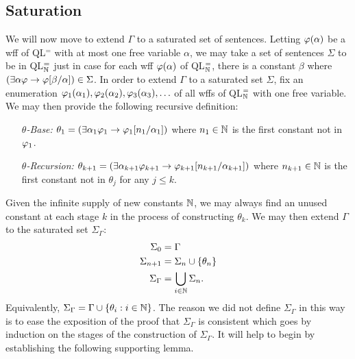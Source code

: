 \subsection{Saturation}%
  \label{sub:Saturation}

We will now move to extend $\Gamma$ to a saturated set of sentences.
Letting $\varphi(\alpha)$ be a wff of QL$^=$ with at most one free variable $\alpha$, we may take a set of sentences $\Sigma$ to be  in QL$^=_{\mathbb{N}}$ just in case for each wff $\varphi(\alpha)$ of QL$^=_{\mathbb{N}}$, there is a constant $\beta$ where $(\exists \alpha\varphi \rightarrow \varphi[\beta/\alpha])\in\Sigma$.
In order to extend $\Gamma$ to a saturated set $\Sigma$, fix an enumeration $\varphi_1(\alpha_1),\varphi_2(\alpha_2),\varphi_3(\alpha_3),\ldots$ of all wffs of QL$^=_{\mathbb{N}}$ with one free variable. %
We may then provide the following recursive definition:
\begin{enumerate}[leftmargin=1in]
  \item[\it $\theta$-Base:] $\theta_1=(\exists \alpha_1\varphi_1\rightarrow \varphi_1[n_1/\alpha_1])$ where $n_1\in\mathbb{N}$ is the first constant not in $\varphi_1$.
  \item[\it $\theta$-Recursion:] $\theta_{k+1}=(\exists \alpha_{k+1}\varphi_{k+1}\rightarrow \varphi_{k+1}[n_{k+1}/\alpha_{k+1}])$  where $n_{k+1}\in\mathbb{N}$ is the first constant not in $\theta_j$ for any $j\leq k$.
\end{enumerate}
Given the infinite supply of new constants $\mathbb{N}$, we may always find an unused constant at each stage $k$ in the process of constructing $\theta_k$.
We may then extend $\Gamma$ to the saturated set $\Sigma_\Gamma$:
\begin{align*}
  \label{name}
  \Sigma_0     &= \Gamma\\
  \Sigma_{n+1} &= \Sigma_n\cup\lbrace\theta_n\rbrace\\
  \Sigma_\Gamma &= \bigcup_{i\in\mathbb{N}}\Sigma_n.
\end{align*}
Equivalently, $\Sigma_\Gamma=\Gamma\cup\lbrace\theta_i:i\in\mathbb{N}\rbrace$.
The reason we did not define $\Sigma_\Gamma$ in this way is to ease the exposition of the proof that $\Sigma_\Gamma$ is consistent which goes by induction on the stages of the construction of $\Sigma_\Gamma$. 
It will help to begin by establishing the following supporting lemma.





